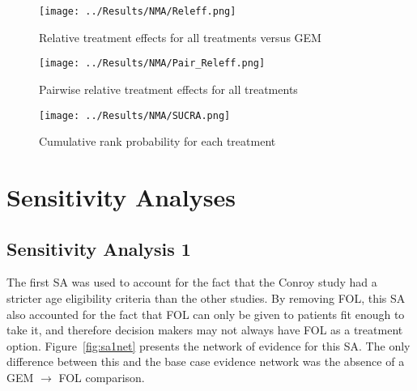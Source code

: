 \begin{figure}[h]
    \centering
    \texttt{[image: ../Results/NMA/Releff.png]}
    \caption{Relative treatment effects for all treatments versus GEM}
    \label{fig:releff}
\end{figure}

\begin{figure}[h]
    \centering
    \texttt{[image: ../Results/NMA/Pair\_Releff.png]}
    \caption{Pairwise relative treatment effects for all treatments}
    \label{fig:pair_releff}
\end{figure}

\begin{figure}[h]
    \centering
    \texttt{[image: ../Results/NMA/SUCRA.png]}
    \caption{Cumulative rank probability for each treatment}
    \label{fig:sucra}
\end{figure}

\clearpage
\section{Sensitivity Analyses}

\subsection{Sensitivity Analysis 1}
The first SA was used to account for the fact that the Conroy study had a stricter age eligibility criteria than the other studies. By removing FOL, this SA also accounted for the fact that FOL can only be given to patients fit enough to take it, and therefore decision makers may not always have FOL as a treatment option. Figure~\ref{fig:sa1net} presents the network of evidence for this SA. The only difference between this and the base case evidence network was the absence of a GEM $\rightarrow$ FOL comparison. \\

